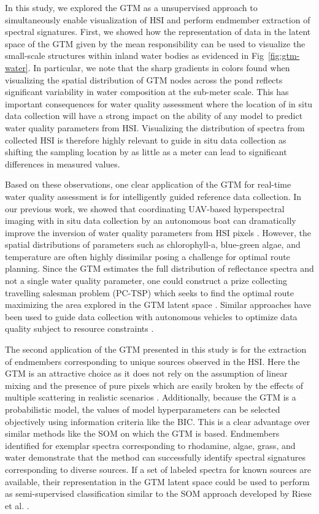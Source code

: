 \documentclass[remotesensing,article,submit,pdftex,moreauthors]{Definitions/mdpi}
\begin{document}
In this study, we explored the GTM as a unsupervised approach to simultaneously enable visualization of HSI and perform endmember extraction of spectral signatures. First, we showed how the representation of data in the latent space of the GTM given by the mean responsibility can be used to visualize the small-scale structures within inland water bodies as evidenced in Fig~\ref{fig:gtm-water}. In particular, we note that the sharp gradients in colors found when visualizing the spatial distribution of GTM nodes across the pond reflects significant variability in water composition at the sub-meter scale. This has important consequences for water quality assessment where the location of in situ data collection will have a strong impact on the ability of any model to predict water quality parameters from HSI. Visualizing the distribution of spectra from collected HSI is therefore highly relevant to guide in situ data collection as shifting the sampling location by as little as a meter can lead to significant differences in measured values.

Based on these observations, one clear application of the GTM for real-time water quality assessment is for intelligently guided reference data collection. In our previous work, we showed that coordinating UAV-based hyperspectral imaging with in situ data collection by an autonomous boat can dramatically improve the inversion of water quality parameters from HSI pixels \cite{robot-team-2}. However, the spatial distributions of parameters such as chlorophyll-a, blue-green algae, and temperature are often highly dissimilar posing a challenge for optimal route planning. Since the GTM estimates the full distribution of reflectance spectra and not a single water quality parameter, one could construct a prize collecting travelling salesman problem (PC-TSP) which seeks to find the optimal route maximizing the area explored in the GTM latent space \cite{balas2007prize}. Similar approaches have been used to guide data collection with autonomous vehicles to optimize data quality subject to resource constraints \cite{suryan2020learning}. 

The second application of the GTM presented in this study is for the extraction of endmembers corresponding to unique sources observed in the HSI. Here the GTM is an attractive choice as it does not rely on the assumption of linear mixing and the presence of pure pixels which are easily broken by the effects of multiple scattering in realistic scenarios \cite{nonlinearity-in-hsi}. Additionally, because the GTM is a probabilistic model, the values of model hyperparameters can be selected objectively using information criteria like the BIC. This is a clear advantage over similar methods like the SOM on which the GTM is based. Endmembers identified for exemplar spectra corresponding to rhodamine, algae, grass, and water demonstrate that the method can successfully identify spectral signatures corresponding to diverse sources. If a set of labeled spectra for known sources are available, their representation in the GTM latent space could be used to perform as semi-supervised classification similar to the SOM approach developed by Riese et al. \cite{riese2019supervised}.
\end{document}
